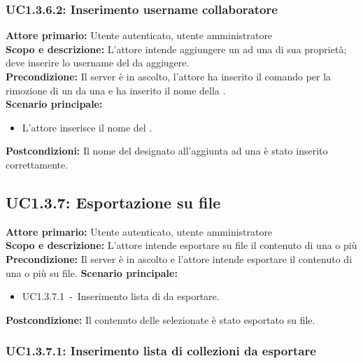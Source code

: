 \documentclass{scalatekids-article}
\begin{document}
\subsubsection{UC1.3.6.2: Inserimento username collaboratore}

\textbf{Attore primario:} Utente autenticato, utente amministratore\\
\textbf{Scopo e descrizione:} L'attore intende aggiungere un  ad una  di sua proprietà; deve inserire lo username del  da aggiugere.\\
\textbf{Precondizione:} Il server è in ascolto, l'attore ha inserito il comando per la rimozione di un  da una  e ha inserito il nome della .\\
\textbf{Scenario principale:}
\begin{itemize}
\item L'attore inserisce il nome del .
\end{itemize}
\textbf{Postcondizioni:} Il nome del  designato all'aggiunta ad una  è stato inserito correttamente.

\subsection{UC1.3.7: Esportazione su file}

\textbf{Attore primario:} Utente autenticato, utente amministratore\\
\textbf{Scopo e descrizione:} L'attore intende esportare su file il contenuto di una o più \\
\textbf{Precondizione:} Il server è in ascolto e l'attore intende esportare il contenuto di una o più  su file.
\textbf{Scenario principale:}
\begin{itemize}
\item UC1.3.7.1\ -\ Inserimento lista di  da esportare. %
\end{itemize}
\textbf{Postcondizione:} Il contenuto delle  selezionate è stato esportato su file.

\subsubsection{UC1.3.7.1: Inserimento lista di collezioni da esportare}
\end{document}
